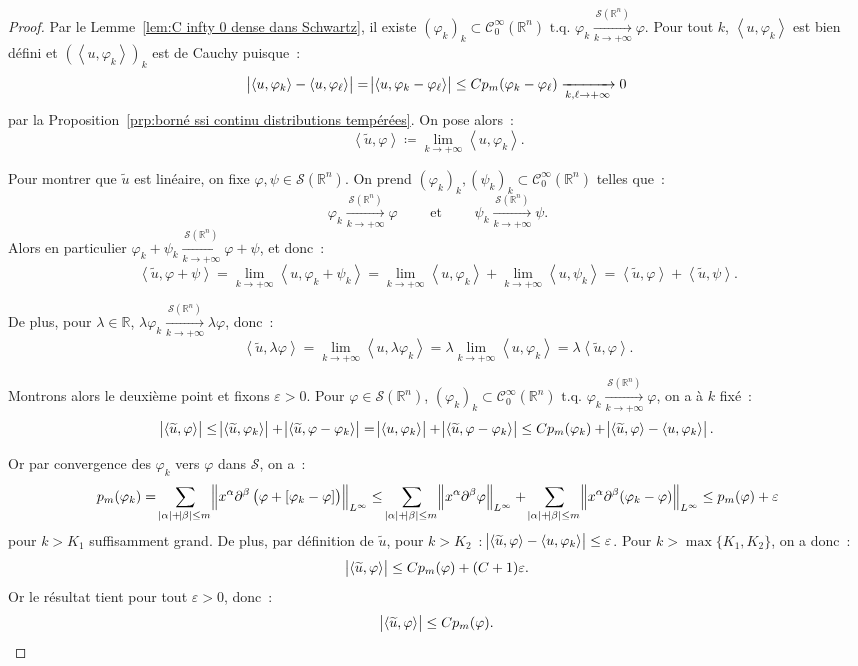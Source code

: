 \documentclass{report}
\newcommand{\R}{{\mathbb R}}
\newcommand{\scpr}[2]{\left\langle#1, #2\right\rangle}
\newcommand{\tq}{\text{ t.q. }}
\newcommand{\st}{\tq}
\newcommand{\pinfty}{{+\infty}}
\theoremstyle{definition}
\theoremstyle{remark}
\begin{document}
\begin{proof} Par le Lemme~\ref{lem:C infty 0 dense dans Schwartz}, il existe
$(\varphi_k)_k \subset \mathcal C^\infty_0(\R^n) \st \varphi_k \xrightarrow[k \to \pinfty]{\mathcal S(\R^n)} \varphi$. Pour tout $k$, $\scpr u{\varphi_k}$ est bien défini et
$(\scpr u{\varphi_k})_k$ est de Cauchy puisque~:
\[\abs {\scpr u{\varphi_k} - \scpr u{\varphi_\ell}} = \abs {\scpr u{\varphi_k-\varphi_\ell}} \leq Cp_m(\varphi_k-\varphi_\ell) \xrightarrow[k,\ell \to \pinfty]{} 0\]
par la Proposition~\ref{prp:borné ssi continu distributions tempérées}. On pose alors~:
\[\scpr {\widetilde u}\varphi \coloneqq \lim_{k \to \pinfty}\scpr u{\varphi_k}.\]

Pour montrer que $\widetilde u$ est linéaire, on fixe $\varphi, \psi \in \mathcal S(\R^n)$. On prend $(\varphi_k)_k, (\psi_k)_k \subset \mathcal C^\infty_0(\R^n)$ telles que~:
\[\varphi_k \xrightarrow[k \to \pinfty]{\mathcal S(\R^n)} \varphi \qquad \text{ et } \qquad \psi_k \xrightarrow[k \to \pinfty]{\mathcal S(\R^n)} \psi.\]
Alors en particulier $\varphi_k + \psi_k \xrightarrow[k \to \pinfty]{\mathcal S(\R^n)} \varphi + \psi$, et donc~:
\[\scpr {\widetilde u}{\varphi + \psi} = \lim_{k \to \pinfty}\scpr u{\varphi_k+\psi_k} = \lim_{k \to \pinfty}\scpr u{\varphi_k}+\lim_{k \to \pinfty}\scpr u{\psi_k}
= \scpr {\widetilde u}\varphi + \scpr {\widetilde u}\psi.\]

De plus, pour $\lambda \in \R$, $\lambda\varphi_k \xrightarrow[k \to \pinfty]{\mathcal S(\R^n)} \lambda\varphi$, donc~:
\[\scpr {\widetilde u}{\lambda \varphi} = \lim_{k \to \pinfty}\scpr u{\lambda\varphi_k} = \lambda\lim_{k \to \pinfty}\scpr u{\varphi_k} = \lambda\scpr {\widetilde u}\varphi.\]

Montrons alors le deuxième point et fixons $\varepsilon > 0$. Pour $\varphi \in \mathcal S(\R^n)$,
$(\varphi_k)_k \subset \mathcal C^\infty_0(\R^n) \st \varphi_k \xrightarrow[k \to \pinfty]{\mathcal S(\R^n)} \varphi$, on a à $k$ fixé~:
\[\abs {\scpr {\widetilde u}\varphi} \leq \abs {\scpr {\widetilde u}{\varphi_k}} + \abs {\scpr {\widetilde u}{\varphi-\varphi_k}}
= \abs {\scpr u{\varphi_k}} + \abs {\scpr {\widetilde u}{\varphi-\varphi_k}} \leq Cp_m(\varphi_k) + \abs {\scpr {\widetilde u}\varphi - \scpr u{\varphi_k}}.\]

Or par convergence des $\varphi_k$ vers $\varphi$ dans $\mathcal S$, on a~:
\[p_m(\varphi_k) = \sum_{\abs \alpha + \abs \beta \leq m}\norm {x^\alpha\partial^\beta\left(\varphi + [\varphi_k - \varphi]\right)}_{L^\infty}
\leq \sum_{\abs \alpha + \abs \beta \leq m}\norm {x^\alpha\partial^\beta\varphi}_{L^\infty}
	+ \sum_{\abs \alpha + \abs \beta \leq m}\norm {x^\alpha\partial^\beta(\varphi_k-\varphi)}_{L^\infty}
\leq p_m(\varphi) + \varepsilon\]
pour $k > K_1$ suffisamment grand. De plus, par définition de $\widetilde u$, pour $k > K_2$~: $\abs {\scpr {\widetilde u}\varphi - \scpr u{\varphi_k}} \leq \varepsilon$.
Pour $k > \max\{K_1, K_2\}$, on a donc~:
\[\abs {\scpr {\widetilde u}\varphi} \leq Cp_m(\varphi) + (C+1)\varepsilon.\]
Or le résultat tient pour tout $\varepsilon > 0$, donc~:
\[\abs {\scpr {\widetilde u}\varphi} \leq Cp_m(\varphi).\]


\end{proof}
\end{document}
